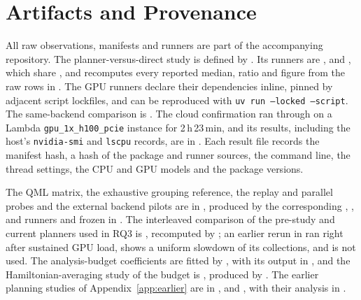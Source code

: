 \section{Artifacts and Provenance}
\label{app:provenance}
All raw observations, manifests and runners are part of the accompanying repository. The planner-versus-direct study is defined by . Its runners are ,  and , which share , and  recomputes every reported median, ratio and figure from the raw rows in . The GPU runners declare their dependencies inline, pinned by adjacent script lockfiles, and can be reproduced with \texttt{uv run --locked --script}. The same-backend comparison is . The cloud confirmation ran  through  on a Lambda \texttt{gpu\_1x\_h100\_pcie} instance for 2\,h\,23\,min, and its results, including the host's \texttt{nvidia-smi} and \texttt{lscpu} records, are in . Each result file records the manifest hash, a hash of the package and runner sources, the command line, the thread settings, the CPU and GPU models and the package versions.

The QML matrix, the exhaustive grouping reference, the replay and parallel probes and the external backend pilots are in , produced by the corresponding , ,  and  runners and frozen in . The interleaved comparison of the pre-study and current planners used in RQ3 is , recomputed by ; an earlier rerun in  ran right after sustained GPU load, shows a uniform slowdown of its collections, and is not used. The analysis-budget coefficients are fitted by , with its output in , and the Hamiltonian-averaging study of the budget is , produced by . The earlier planning studies of Appendix~\ref{app:earlier} are in ,  and , with their analysis in .

